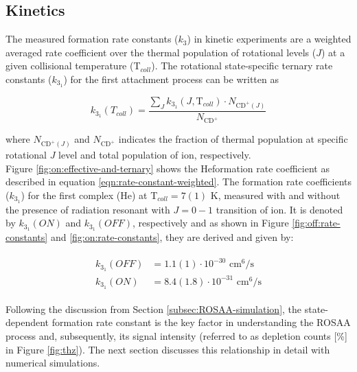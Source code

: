 \subsection{Kinetics}
\label{subsec:CD+-kinetics}

The measured formation rate constants ($k_3$) in kinetic experiments are a
weighted averaged rate coefficient over the thermal population of rotational
levels ($J$) at a given collisional temperature (T$_{coll}$). The rotational
state-specific ternary rate constants ($k_{3_1}$) for the first attachment
process can be written as

\begin{equation}
    k_{3_1} (T_{coll}) = \frac{\sum_{J} k_{3_1} (J, \text{T}_{coll}) \cdot N_{\text{CD}^+ (J)} }{N_{\text{CD}^+}}
    \label{eqn:rate-constant-weighted}
\end{equation}

where $N_{\text{CD}^+ (J)}$ and $N_{\text{CD}^+}$ indicates the fraction of
thermal population at specific rotational $J$ level and total population of \CD
ion, respectively.\\ 

Figure \ref{fig:on:effective-and-ternary} shows the He\CD formation rate
coefficient as described in equation \ref{eqn:rate-constant-weighted}. The
formation rate coefficients ($k_{3_1}$) for the first complex (He\CD) at
T$_{coll}=7(1)$ K, measured with and without the presence of radiation resonant
with $J=0-1$ transition of \CD ion. It is denoted by $k_{3_1}(ON)$ and
$k_{3_1}(OFF)$, respectively and as shown in Figure
\ref{fig:off:rate-constants} and \ref{fig:on:rate-constants}, they are derived
and given by:

\begin{align}
    \label{eqn:k-on-off}
    \begin{split}
        k_{3_1}(OFF) &= 1.1(1) \cdot 10^{-30} \text{ cm}^6/\text{s}\\
        k_{3_1}(ON) &= 8.4(1.8) \cdot 10^{-31} \text{ cm}^6/\text{s}
    \end{split}
\end{align}

Following the discussion from Section \ref{subsec:ROSAA-simulation}, the
state-dependent formation rate constant is the key factor in understanding the
ROSAA process and, subsequently, its signal intensity (referred to as depletion
counts [\%] in Figure \ref{fig:thz}). The next section discusses this
relationship in detail with numerical simulations.

